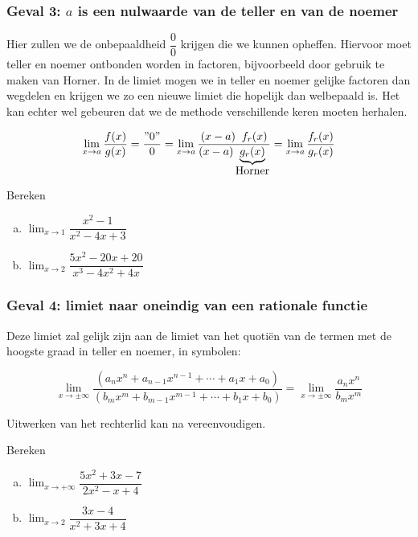 \documentclass[12pt]{article}
\newenvironment{eigenschap}
{
  \vspace{0.4cm}
  \begin{mdframed}[nobreak=true,frametitle={Eigenschap}]
  }{%
  \end{mdframed}
}
\begin{document}
\subsubsection*{Geval 3: $a$ is een nulwaarde van de teller en van de noemer}

Hier zullen we de onbepaaldheid $\dfrac{0}{0}$ krijgen die we kunnen opheffen. Hiervoor moet teller en noemer ontbonden worden in factoren, bijvoorbeeld door gebruik te maken van Horner. In de limiet mogen we in teller en noemer gelijke factoren dan wegdelen en krijgen we zo een nieuwe limiet die hopelijk dan welbepaald is. Het kan echter wel gebeuren dat we de methode verschillende keren moeten herhalen.

\begin{eigenschap}
  $$\lim_{x\to a}\dfrac{f(x)}{g(x)}=\dfrac{"0"}{0}=\lim_{x\to a}\dfrac{(x-a)\;\;f_r(x)}{(x-a)\underbrace{g_r(x)}_{\mbox{Horner}}}=\lim_{x\to a}\dfrac{f_r(x)}{g_r(x)}$$
\end{eigenschap}

\begin{oefening}
  Bereken
  \begin{enumerate}[(a)]
  \item $\displaystyle\lim_{x\to1}\dfrac{x^2-1}{x^2-4x+3}$
  \item $\displaystyle\lim_{x\to2}\dfrac{5x^2-20x+20}{x^3-4x^2+4x}$
  \end{enumerate}
\end{oefening}

\subsubsection*{Geval 4: limiet naar oneindig van een rationale functie}

Deze limiet zal gelijk zijn aan de limiet van het quotiën van de termen met de hoogste graad in teller en noemer, in symbolen:

\begin{eigenschap}
  $$\lim_{x\to \pm\infty}\dfrac{\left(a_nx^n+a_{n-1}x^{n-1}+\cdots+a_1x+a_0\right)}{\left(b_mx^m+b_{m-1}x^{m-1}+\cdots+b_1x+b_0\right)}=\lim_{x\to \pm\infty}\dfrac{a_nx^n}{b_mx^m}$$
\end{eigenschap}

Uitwerken van het rechterlid kan na vereenvoudigen.

\begin{oefening}
  Bereken
  \begin{enumerate}[(a)]
  \item $\displaystyle\lim_{x\to+\infty}\dfrac{5x^2+3x-7}{2x^2-x+4}$
  \item $\displaystyle\lim_{x\to2}\dfrac{3x-4}{x^2+3x+4}$
  \end{enumerate}
\end{oefening}
\end{document}
